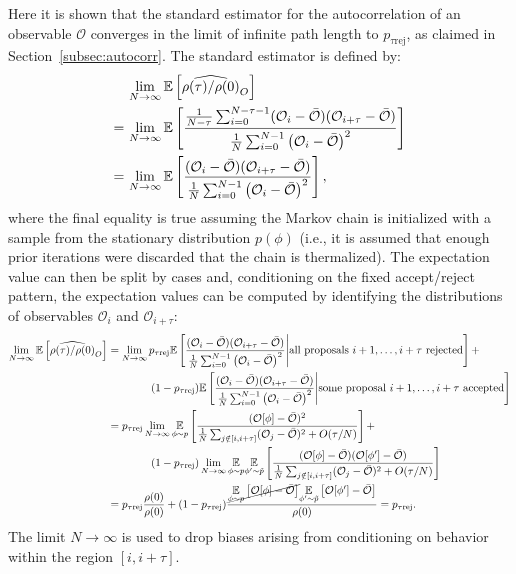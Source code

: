 Here it is shown that the standard estimator for the autocorrelation of an observable $\mathcal{O}$ converges in the limit of infinite path length to  $p_{\tau \mathrm{rej}}$, as claimed in Section~\ref{subsec:autocorr}. The standard estimator is defined by:
%
\begin{align}
& \lim_{N\rightarrow\infty} \underset{}{\mathbb{E}}\left[ \widehat{\rho(\tau)/\rho(0)}_O \right] \\
=\,&
    \lim_{N\rightarrow\infty} \underset{}{\mathbb{E}} \left[ \frac{\frac{1}{N-\tau} \sum_{i=0}^{N-\tau-1} (\mathcal{O}_i - \bar{\mathcal{O}})(\mathcal{O}_{i+\tau}-\bar{\mathcal{O}})}{\frac{1}{N} \sum_{i=0}^{N-1} \left(\mathcal{O}_i - \bar{\mathcal{O}}\right)^2} \right] \\
=\,& \lim_{N\rightarrow\infty} \underset{}{\mathbb{E}} \left[ \frac{(\mathcal{O}_i - \bar{\mathcal{O}})(\mathcal{O}_{i+\tau}-\bar{\mathcal{O}})}{\frac{1}{N} \sum_{i=0}^{N-1} \left(\mathcal{O}_i - \bar{\mathcal{O}}\right)^2} \right],
\end{align}
%
where the final equality is true assuming the Markov chain is initialized with a sample from the stationary distribution $p(\phi)$ (i.e., it is assumed that enough prior iterations were discarded that the chain is thermalized). The expectation value can then be split by cases and, conditioning on the fixed accept/reject pattern, the expectation values can be computed by identifying the distributions of observables $\mathcal{O}_i$ and $\mathcal{O}_{i+\tau}$:
%
\begin{align}
\lim_{N\rightarrow\infty} \underset{}{\mathbb{E}}\left[ \widehat{\rho(\tau)/\rho(0)}_O \right]
&= \lim_{N\rightarrow \infty} p_{\tau\text{rej}} \underset{}{\mathbb{E}} \left[ \frac{(\mathcal{O}_i - \bar{\mathcal{O}})(\mathcal{O}_{i+\tau}-\bar{\mathcal{O}})}{\frac{1}{N} \sum_{i=0}^{N-1} \left(\mathcal{O}_i - \bar{\mathcal{O}}\right)^2}
    \Bigg| \text{all proposals } i+1, \dots, i+\tau \text{ rejected} \right] + \nonumber\\
    &\qquad\qquad (1-p_{\tau\text{rej}}) \underset{}{\mathbb{E}} \left[ \frac{(\mathcal{O}_i - \bar{\mathcal{O}})(\mathcal{O}_{i+\tau}-\bar{\mathcal{O}})}{\frac{1}{N} \sum_{i=0}^{N-1} \left(\mathcal{O}_i - \bar{\mathcal{O}}\right)^2}
    \Bigg| \text{some proposal } i+1, \dots, i+\tau \text{ accepted} \right] \\
&= p_{\tau\text{rej}} \lim_{N\rightarrow\infty} \underset{\phi\sim p}{\mathbb{E}} \left[ \frac{(\mathcal{O}[\phi] - \bar{\mathcal{O}})^2}{\frac{1}{N} \sum_{j \notin [i,i+\tau]} (\mathcal{O}_j - \bar{\mathcal{O}})^2 + O(\tau/N)} \right] + \nonumber\\
    &\qquad\qquad (1-p_{\tau\text{rej}}) \lim_{N\rightarrow\infty} \underset{\phi\sim p}{\mathbb{E}} \underset{\phi' \sim \tilde{p}}{\mathbb{E}} \left[  \frac{(\mathcal{O}[\phi] - \bar{\mathcal{O}})(\mathcal{O}[\phi'] - \bar{\mathcal{O}})}{\frac{1}{N} \sum_{j \notin [i,i+\tau]} (\mathcal{O}_j - \bar{\mathcal{O}})^2 + O(\tau/N)} \right] \\
&= p_{\tau\text{rej}} \frac{\rho(0)}{\rho(0)} + (1-p_{\tau\text{rej}}) \frac{\cancel{\underset{\phi\sim p}{\mathbb{E}} \left[ \mathcal{O}[\phi] - \bar{\mathcal{O}} \right]} \underset{\phi'\sim \tilde{p}}{\mathbb{E}} \left[ \mathcal{O}[\phi'] - \bar{\mathcal{O}} \right]}{\rho(0)} = p_{\tau\text{rej}}.
\end{align}
%
The limit $N \rightarrow \infty$ is used to drop biases arising from conditioning on behavior within the region $[i,i+\tau]$.


